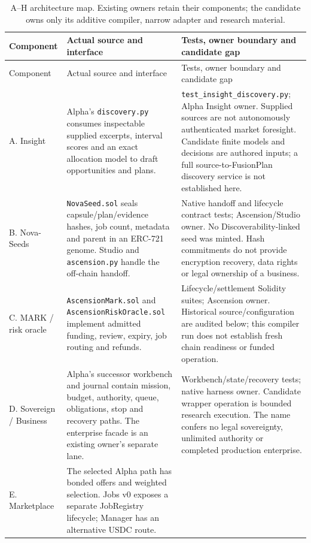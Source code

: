 \documentclass[11pt,letterpaper]{article}
\theoremstyle{definition}\newtheorem{definition}[theorem]{Definition}
\theoremstyle{remark}\newtheorem{remark}[theorem]{Remark}
\begin{document}
\begin{longtable}{@{}P{.15\linewidth}P{.39\linewidth}P{.40\linewidth}@{}}
\caption{A--H architecture map. Existing owners retain their components; the candidate owns only its additive compiler, narrow adapter and research material.}\label{tab:architecture}\\
\toprule
Component & Actual source and interface & Tests, owner boundary and candidate gap \\
\midrule
\endfirsthead
\toprule Component & Actual source and interface & Tests, owner boundary and candidate gap \\\midrule
\endhead
A. Insight &
Alpha's \texttt{discovery.py} consumes inspectable supplied excerpts, interval scores and an exact allocation model to draft opportunities and plans. &
\texttt{test\_insight\_discovery.py}; Alpha Insight owner. Supplied sources are not autonomously authenticated market foresight. Candidate finite models and decisions are authored inputs; a full source-to-FusionPlan discovery service is not established here. \\[.3em]
B. Nova-Seeds &
\texttt{NovaSeed.sol} seals capsule/plan/evidence hashes, job count, metadata and parent in an ERC-721 genome. Studio and \texttt{ascension.py} handle the off-chain handoff. &
Native handoff and lifecycle contract tests; Ascension/Studio owner. No Discoverability-linked seed was minted. Hash commitments do not provide encryption recovery, data rights or legal ownership of a business. \\[.3em]
C. MARK / risk oracle &
\texttt{AscensionMark.sol} and \texttt{AscensionRiskOracle.sol} implement admitted funding, review, expiry, job routing and refunds. &
Lifecycle/settlement Solidity suites; Ascension owner. Historical source/configuration are audited below; this compiler run does not establish fresh chain readiness or funded operation. \\[.3em]
D. Sovereign / Business &
Alpha's successor workbench and journal contain mission, budget, authority, queue, obligations, stop and recovery paths. The enterprise facade is an existing owner's separate lane. &
Workbench/state/recovery tests; native harness owner. Candidate wrapper operation is bounded research execution. The name confers no legal sovereignty, unlimited authority or completed production enterprise. \\[.3em]
E. Marketplace &
The selected Alpha path has bonded offers and weighted selection. Jobs v0 exposes a separate JobRegistry lifecycle; Manager has an alternative USDC route. &

\end{longtable}
\end{document}
